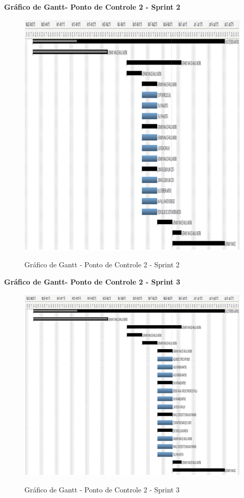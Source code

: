     \pagebreak
  \textbf{Gráfico de Gantt- Ponto de Controle 2 - Sprint 2}
   \begin{figure}[!h]
    \centering
    \includegraphics[scale = 1]{editaveis/figuras/ganttPC2S2}
    \label{Gráfico de Gantt PC2S2}
    \caption{Gráfico de Gantt - Ponto de Controle 2 - Sprint 2}
   \end{figure}
   \FloatBarrier
   
    \pagebreak
  \textbf{Gráfico de Gantt- Ponto de Controle 2 - Sprint 3}
   \begin{figure}[!h]
    \centering
    \includegraphics[scale = 1]{editaveis/figuras/ganttPC2S3}
    \label{Gráfico de Gantt PC2S3}
    \caption{Gráfico de Gantt - Ponto de Controle 2 - Sprint 3}
   \end{figure}
   \FloatBarrier
   
